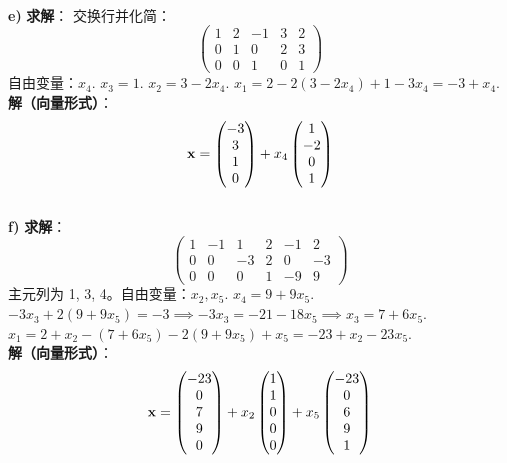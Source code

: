 \begin{exer}
\\
\textbf{e)}
\textbf{求解}：
交换行并化简：
$$ \left(\begin{array}{cccc|c} 1 & 2 & -1 & 3 & 2 \\ 0 & 1 & 0 & 2 & 3 \\ 0 & 0 & 1 & 0 & 1 \end{array}\right) $$
自由变量：$x_4$.
$x_3 = 1$.
$x_2 = 3 - 2x_4$.
$x_1 = 2 - 2(3-2x_4) + 1 - 3x_4 = -3 + x_4$.
\\
\textbf{解（向量形式）}：
$$ \mathbf{x} = \begin{pmatrix} -3 \\ 3 \\ 1 \\ 0 \end{pmatrix} + x_4 \begin{pmatrix} 1 \\ -2 \\ 0 \\ 1 \end{pmatrix} $$
\\
\textbf{f)}
\textbf{求解}：
$$ \left(\begin{array}{ccccc|c} 1 & -1 & 1 & 2 & -1 & 2 \\ 0 & 0 & -3 & 2 & 0 & -3 \\ 0 & 0 & 0 & 1 & -9 & 9 \end{array}\right) $$
主元列为 1, 3, 4。自由变量：$x_2, x_5$.
$x_4 = 9 + 9x_5$.
$-3x_3 + 2(9+9x_5) = -3 \implies -3x_3 = -21 - 18x_5 \implies x_3 = 7 + 6x_5$.
$x_1 = 2 + x_2 - (7+6x_5) - 2(9+9x_5) + x_5 = -23 + x_2 - 23x_5$.
\\
\textbf{解（向量形式）}：
$$ \mathbf{x} = \begin{pmatrix} -23 \\ 0 \\ 7 \\ 9 \\ 0 \end{pmatrix} + x_2 \begin{pmatrix} 1 \\ 1 \\ 0 \\ 0 \\ 0 \end{pmatrix} + x_5 \begin{pmatrix} -23 \\ 0 \\ 6 \\ 9 \\ 1 \end{pmatrix} $$
\\

\end{exer}

